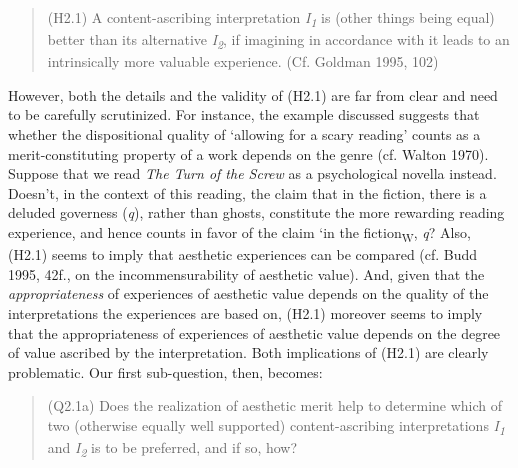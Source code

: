 \vspace{-.2cm}
\begin{quote}
(H2.1) A content-ascribing interpretation \emph{I\textsubscript{1}} is
(other things being equal) better than its alternative
\emph{I\textsubscript{2}}, if imagining in accordance with it leads to
an intrinsically more valuable experience. (Cf. Goldman 1995, 102)
\end{quote}
\vspace{-.2cm}

\noindent However, both the details and the validity of (H2.1) are far from clear
and need to be carefully scrutinized. For instance, the example
discussed suggests that whether the dispositional quality of `allowing
for a scary reading' counts as a merit-constituting property of a work
depends on the genre (cf. Walton 1970). Suppose that we read \emph{The
Turn of the Screw} as a psychological novella instead.{~ }Doesn't, in
the context of this reading, the claim that in the fiction, there is a
deluded governess (\emph{q}), rather than ghosts, constitute the more
rewarding reading experience, and hence counts in favor of the claim `in
the fiction\textsubscript{W}, \emph{q}? Also, (H2.1) seems to imply that
aesthetic experiences can be compared (cf. Budd 1995, 42f., on the
incommensurability of aesthetic value). And, given that the
\emph{appropriateness} of experiences of aesthetic value depends on the
quality of the interpretations the experiences are based on, (H2.1)
moreover seems to imply that the appropriateness of experiences of
aesthetic value depends on the degree of value ascribed by the
interpretation. Both implications of (H2.1) are clearly problematic. Our
first sub-question, then, becomes:

\vspace{-.2cm}
\begin{quote}
(Q2.1a)  Does the realization of aesthetic merit help to determine
which of two (otherwise equally well supported) content-ascribing
interpretations \emph{I\textsubscript{1}} and \emph{I\textsubscript{2}}
is to be preferred, and if so, how?
\end{quote}
\vspace{-.2cm}

